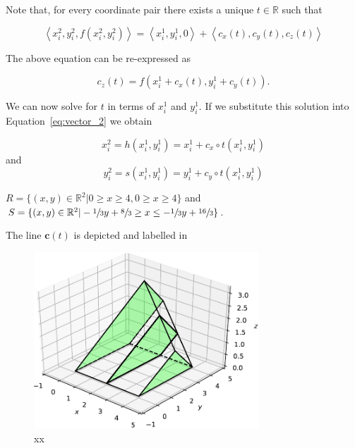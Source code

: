 \documentclass{article}
\theoremstyle{theorem}
\theoremstyle{definition}
\begin{document}
Note that, for every coordinate pair there exists a unique $t\in \mathbb{R}$ such that 

\begin{equation}
\label{eq:vector_2}
\left< x_i^2, y_i^2, f(x_i^2,y_i^2) \right > = \left < x_i^1, y_i^1, 0 \right > + \left <c_x(t),c_y(t),c_z(t)\right >  
\end{equation}

The above equation can be re-expressed as

\begin{equation}
c_z(t) = f(x_i^1 + c_x(t),y_i^1 + c_y(t)). 
\end{equation}

We can now solve for $t$ in terms of $x_i^1$ and $y_i^1$. If we substitute this solution into Equation~\ref{eq:vector_2} we obtain

\begin{equation}
x_i^2 = h(x_i^1,y_i^1) = x_i^1 + c_x\circ t(x_i^1,y_i^1) 
\end{equation}
and 
\begin{equation}
y_i^2 = s(x_i^1,y_i^1) = y_i^1 + c_y\circ t(x_i^1,y_i^1) 
\end{equation}


















$R = \{(x,y)\in\mathbb{R}^2|0 \geq x \geq 4, 0 \geq x \geq 4\}$
and $S = \{(x,y)\in\mathbb{R}^2|-\sfrac{1}{3}y+\sfrac{8}{3}\geq x\leq -\sfrac{1}{3}y+\sfrac{16}{3} \}$.



The line $\mathbf{c}(t)$  is depicted and labelled in 


\begin{figure}[htb]
\centering
\includegraphics[width=0.75\textwidth]{prismatoid.pdf}
\caption{xx}
\label{fig:prismatoid}
\end{figure}
\end{document}
